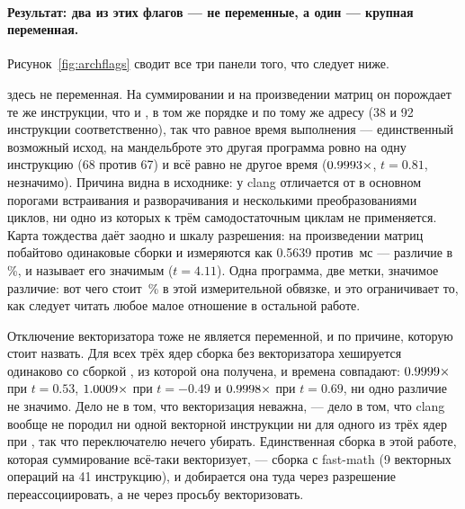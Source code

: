 \paragraph{Результат: два из этих флагов --- не переменные, а один --- крупная переменная.}
Рисунок~\ref{fig:archflags} сводит все три панели того, что следует ниже.

 здесь не переменная. На суммировании и на произведении матриц он порождает те же
инструкции, что и , в том же порядке и по тому же адресу (38 и 92 инструкции
соответственно), так что равное время выполнения --- единственный возможный исход, на мандельброте
это другая программа ровно на одну инструкцию (68 против 67) и всё равно не другое время
($\meas{ratio:b1_flags-314:mandelbrot/O3|b1_flags-314:mandelbrot/O2}{0.9993}\times$, $t=0.81$, незначимо). Причина видна в исходнике:  у clang отличается от
 в основном порогами встраивания и разворачивания и несколькими преобразованиями циклов,
ни одно из которых к трём самодостаточным циклам не применяется. Карта тождества даёт заодно и
шкалу разрешения: на произведении матриц побайтово одинаковые сборки  и 
измеряются как 0.5639 против \,мс --- различие в \,\%, и  называет его
значимым ($t=4.11$). Одна программа, две метки, значимое различие: вот чего стоит \,\% в этой
измерительной обвязке, и это ограничивает то, как следует читать любое малое отношение в остальной
работе.


Отключение векторизатора тоже не является переменной, и по причине, которую стоит назвать. Для всех
трёх ядер сборка без векторизатора хешируется одинаково со сборкой , из которой
она получена, и времена совпадают: $\meas{ratio:b1_flags-314:arraysum/O3native_novec|b1_flags-314:arraysum/O3native}{0.9999}\times$ при $t=0.53$, $\meas{ratio:b1_flags-314:mandelbrot/O3native_novec|b1_flags-314:mandelbrot/O3native}{1.0009}\times$ при $t=-0.49$ и
$\meas{ratio:b1_flags-314:matmul/O3native_novec|b1_flags-314:matmul/O3native}{0.9998}\times$ при $t=0.69$, ни одно различие не значимо. Дело не в том, что векторизация неважна, --- дело в
том, что clang вообще не породил ни одной векторной инструкции ни для одного из трёх ядер при
, так что переключателю нечего убирать. Единственная сборка в этой работе,
которая суммирование всё-таки векторизует, --- сборка с fast-math (9 векторных операций на 41
инструкцию), и добирается она туда через разрешение переассоциировать, а не через просьбу
векторизовать.

